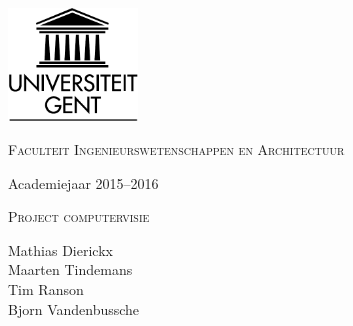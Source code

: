 
\begin{titlepage}

\fontsize{12pt}{14pt}\selectfont

\begin{center}

\includegraphics[height=3cm]{figuren/ruglogo}

\vspace{1cm}

\fontsize{14pt}{17pt}\selectfont
\textsc{Faculteit Ingenieurswetenschappen en Architectuur}
\fontsize{12pt}{14pt}\selectfont
\vspace{0.3cm}

\vspace{1.2cm}

Academiejaar 2015--2016

\vspace{2.8cm}

\fontsize{17.28pt}{21pt}\selectfont

{\textsc{Project computervisie}}

\fontsize{12pt}{14pt}\selectfont

\vspace{8cm}

Mathias Dierickx \\
Maarten Tindemans \\
Tim Ranson \\
Bjorn Vandenbussche	

\end{center}
\end{titlepage}

\thispagestyle{empty}
